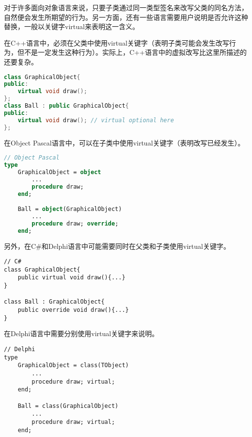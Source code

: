 对于许多面向对象语言来说，只要子类通过同一类型签名来改写父类的同名方法，自然便会发生所期望的行为。另一方面，还有一些语言需要用户说明是否允许这种替换，一般以关键字virtual来表明这一含义。

在C++语言中，必须在父类中使用virtual关键字（表明子类可能会发生改写行为，但不是一定发生这种行为）。实际上，C++语言中的虚拟改写比这里所描述的还要复杂。

\begin{lstlisting}[language=C++]
class GraphicalObject{
public:
	virtual void draw();
};
class Ball : public GraphicalObject{
public:
	virtual void draw(); // virtual optional here	
};
\end{lstlisting}

在Object Pascal语言中，可以在子类中使用virtual关键字（表明改写已经发生）。


\begin{lstlisting}[language=Pascal]
// Object Pascal
type
	GraphicalObject = object
		...
		procedure draw;
	end;

	Ball = object(GraphicalObject)
		...
		procedure draw; override;
	end;
\end{lstlisting}

另外，在C\#和Delphi语言中可能需要同时在父类和子类使用virtual关键字。



\begin{lstlisting}[language={[Sharp]C}]
// C#
class GraphicalObject{
	public virtual void draw(){...}
}

class Ball : GraphicalObject{
	public override void draw(){...}
}
\end{lstlisting}

在Delphi语言中需要分别使用virtual关键字来说明。



\begin{lstlisting}[language=Delphi]
// Delphi
type
	GraphicalObject = class(TObject)
		...
		procedure draw; virtual;
	end;

	Ball = class(GraphicalObject)
		...
		procedure draw; virtual;
	end;
\end{lstlisting}





\begin{lstlisting}[language=C++]

\end{lstlisting}





